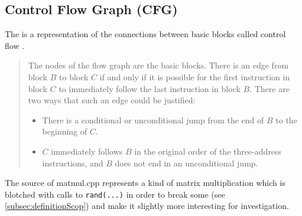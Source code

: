 \subsection{Control Flow Graph (CFG)}\label{subsec:cfg}
The \cfg is a representation of the connections between basic blocks called control flow \cite[chapter 8.4.3, p.~529]{Drachenbuch}.

\begin{quotation}\noindent
    \grqq The nodes of the flow graph are the basic blocks.
    There is an edge from block \(B\) to block \(C\) if and only if it is possible for the first instruction in block \(C\) to immediately follow the last instruction in block \(B\).
    There are two ways that such an edge could be justified:
    \begin{itemize}
        \item There is a conditional or unconditional jump from the end of \(B\) to the beginning of \(C\).
        \item \(C\) immediately follows \(B\) in the original order of the three-address instructions, and \(B\) does not end in an unconditional jump.\grqq
    \end{itemize}
\end{quotation}
\begin{code}
    \caption[Source of matmul.cpp]{The source of matmul.cpp represents a kind of matrix multiplication which is blotched with calls to \texttt{rand(...)} in order to break some \scops (see \autoref{subsec:definitionScop}) and make it slightly more interesting for investigation.}
    \inputminted{c++}{cpp/matmul.cpp}
    \label{lst:matmulcpp}
\end{code}
